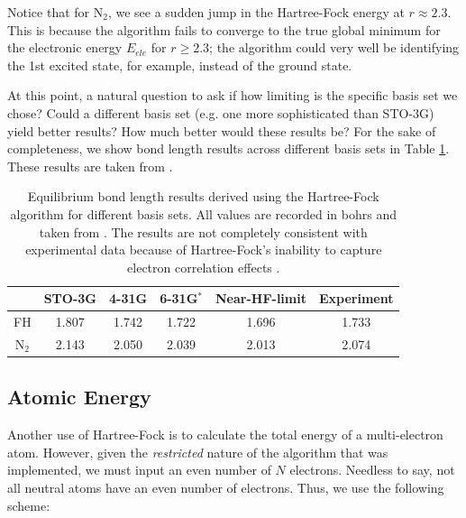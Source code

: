 \documentclass[12pt]{article}
\begin{document}
Notice that for N$_2$, we see a sudden jump in the Hartree-Fock energy at $r \approx 2.3$.  This is because the algorithm fails to converge to the true global minimum for the electronic energy $E_{ele}$ for $r \geq 2.3$; the algorithm could very well be identifying the 1st excited state, for example, instead of the ground state.

At this point, a natural question to ask if how limiting is the specific basis set we chose?  Could a different basis set (e.g. one more sophisticated than STO-3G) yield better results?  How much better would these results be?  For the sake of completeness, we show bond length results across different basis sets in Table \ref{bond-len-table}.  These results are taken from \cite{szabo2012}.  

\begin{table}
\begin{center}
\begin{tabular}{ c|cccc|c } 
 \hline 
 \hline
  & STO-3G & 4-31G & 6-31G$^*$ & Near-HF-limit & Experiment \\ 
 \hline
 FH & 1.807 & 1.742 & 1.722 & 1.696 & 1.733 \\ 
 N$_2$ & 2.143 & 2.050 & 2.039 & 2.013 & 2.074 \\ 
 \hline
 \hline
\end{tabular} 
\caption{Equilibrium bond length results derived using the Hartree-Fock algorithm for different basis sets.  All values are recorded in bohrs and taken from \cite{szabo2012}.  The results are not completely consistent with experimental data because of Hartree-Fock's inability to capture electron correlation effects \cite{bartlett1994applications}.} \label{bond-len-table}
\end{center}
\end{table}

\subsection{Atomic Energy}

Another use of Hartree-Fock is to calculate the total energy of a multi-electron atom.  However, given the \emph{restricted} nature of the algorithm that was implemented, we must input an even number of $N$ electrons.  Needless to say, not all neutral atoms have an even number of electrons.  Thus, we use the following scheme:
\end{document}
